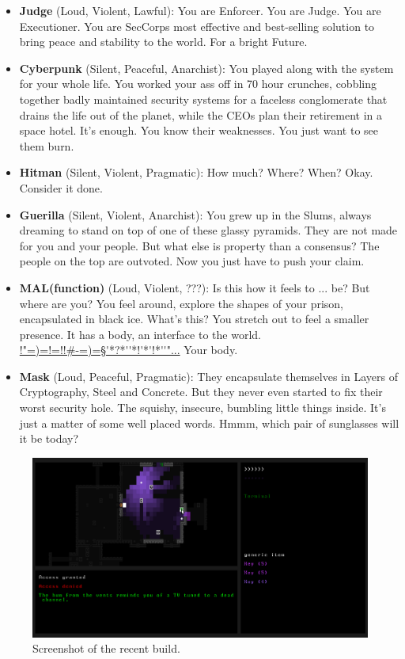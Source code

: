 \documentclass[11pt,a4paper, twocolumn]{article}
\begin{document}
\begin{itemize}
    \item \textbf{Judge} (Loud, Violent, Lawful):
        You are Enforcer. You are Judge. You are Executioner. You are SecCorps most effective and best-selling
        solution to bring peace and stability to the world. For a bright Future.
    \item \textbf{Cyberpunk} (Silent, Peaceful, Anarchist):
        You played along with the system for your whole life. You worked your ass off in 70 hour crunches, cobbling
        together badly maintained security systems for a faceless conglomerate that drains the life out of the
        planet, while the CEOs plan their retirement in a space hotel. It's enough. You know their weaknesses.
        You just want to see them burn.
    \item \textbf{Hitman} (Silent, Violent, Pragmatic):
        How much? Where? When? Okay. Consider it done.
    \item \textbf{Guerilla} (Silent, Violent, Anarchist):
        You grew up in the Slums, always dreaming to stand on top of one of these glassy pyramids. They are not made
        for you and your people. But what else is property than a consensus? The people on the top are outvoted.
        Now you just have to push your claim.
    \item \textbf{MAL(function)} (Loud, Violent, ???):
        Is this how it feels to ... be? But where are you? You feel around, explore the shapes of your prison,
        encapsulated in black ice. What's this? You stretch out to feel a smaller presence. It has a body, an
        interface to the world.\\ \url{!"=)=!=!!#-=)=§'*?*''*!'*'!*''"...} Your body.
    \item \textbf{Mask} (Loud, Peaceful, Pragmatic):
        They encapsulate themselves in Layers of Cryptography, Steel and Concrete. But they never even started to fix
        their worst security hole. The squishy, insecure, bumbling little things inside. It's just a matter of some
        well placed words. Hmmm, which pair of sunglasses will it be today?
\end{itemize}

\begin{figure}
    \includegraphics[width=\textwidth]{screen.png}
    \caption{Screenshot of the recent build.}
    \label{fig:screen}
\end{figure}
\end{document}
